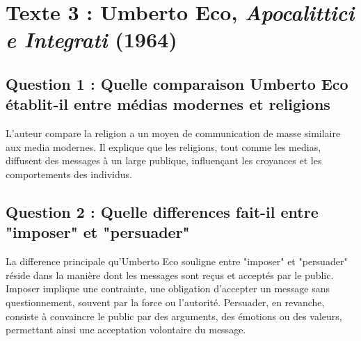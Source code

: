 \documentclass[a4paper,12pt]{article}
\begin{document}
\section*{Texte 3 : Umberto Eco, \textit{Apocalittici e Integrati} (1964)}
\subsection*{Question 1 : Quelle comparaison Umberto Eco établit-il entre médias modernes et religions}
L'auteur compare la religion a un moyen de communication de masse similaire aux media modernes.
Il explique que les religions, tout comme les medias, diffusent des messages à un large publique, influençant les croyances et les comportements des individus.

\subsection*{Question 2 : Quelle differences fait-il entre "imposer" et "persuader"}
La difference principale qu'Umberto Eco souligne entre "imposer" et "persuader" réside dans la manière dont les messages sont reçus et acceptés par le public.
Imposer implique une contrainte, une obligation d'accepter un message sans questionnement, souvent par la force ou l'autorité.
Persuader, en revanche, consiste à convaincre le public par des arguments, des émotions ou des valeurs, permettant ainsi une acceptation volontaire du message.
\end{document}

